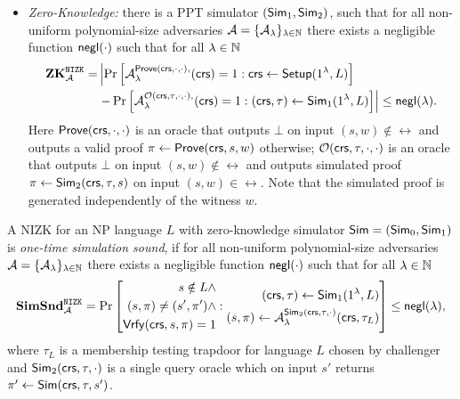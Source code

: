\begin{definition}
\begin{itemize}
\item \emph{Zero-Knowledge:} there is a PPT simulator $(\mathsf{Sim}_1, \mathsf{Sim}_2)$, such that for all non-uniform polynomial-size adversaries $\mathcal{A} = \{\mathcal{A}_{\lambda}\}_{\lambda \in \mathbb{N}}$ there exists a negligible function $\mathsf{negl}(\cdot)$ such that for all $\lambda \in \mathbb{N}$ 
\begin{align*}
\mathbf{ZK}_{\mathcal{A}}^{\mathtt{NIZK}} =& 
\left| \Pr\left[ \mathcal{A}_{\lambda}^{\mathsf{Prove}(\mathsf{crs}, \cdot, \cdot),}(\mathsf{crs}) = 1:\mathsf{crs} \leftarrow \mathsf{Setup}(1{^{\lambda}}, L) \right] \right. \\
&\left. - \Pr\left[ \mathcal{A}_{\lambda}^{\mathcal{O}(\mathsf{crs}, \tau, \cdot, \cdot),}(\mathsf{crs}) = 1: (\mathsf{crs}, \tau) \leftarrow \mathsf{Sim}_1(1{^{\lambda}}, L) \right] \right|
\leq \mathsf{negl}(\lambda).
\end{align*}
Here $\mathsf{Prove}(\mathsf{crs}, \cdot, \cdot)$ is an oracle that outputs $\bot$ on input $(s,w) \notin \rel$ and outputs a valid proof $\pi \leftarrow \mathsf{Prove}(\mathsf{crs}, s, w)$ otherwise; $\mathcal{O}(\mathsf{crs}, \tau, \cdot, \cdot)$ is an oracle that outputs $\bot$ on input $(s,w) \notin \rel$ and outputs simulated proof $\pi \leftarrow \mathsf{Sim}_2(\mathsf{crs}, \tau, s)$ on input $(s,w) \in \rel$. Note that the simulated proof is generated independently of the witness $w$.
\end{itemize}

\end{definition}

\begin{definition}
A NIZK for an NP language $L$ with zero-knowledge simulator $\mathsf{Sim} = (\mathsf{Sim}_0, \mathsf{Sim}_1)$ is \emph{one-time simulation sound}, if for all non-uniform polynomial-size adversaries $\mathcal{A} = \{\mathcal{A}_{\lambda}\}_{\lambda \in \mathbb{N}}$ there exists a negligible function $\mathsf{negl}(\cdot)$ such that for all $\lambda \in \mathbb{N}$ 
\[
\mathbf{SimSnd}_{\mathcal{A}}^{\mathtt{NIZK}} = \Pr\left[
\begin{aligned}
s \notin L \land \\
(s, \pi) \neq (s', \pi') \land \\
\mathsf{Vrfy}(\mathsf{crs}, s, \pi) = 1
\end{aligned}
:
\begin{aligned}
(\mathsf{crs}, \tau) \leftarrow \mathsf{Sim}_1(1{^{\lambda}}, L) \\
(s, \pi) \leftarrow \mathcal{A}_{\lambda}^{\mathsf{Sim}_2(\mathsf{crs}, \tau, \cdot)}(\mathsf{crs}, \tau_L)
\end{aligned} \right] \leq \mathsf{negl}(\lambda),
\]
where $\tau_L$ is a membership testing trapdoor for language $L$ chosen by challenger and $\mathsf{Sim}_2(\mathsf{crs}, \tau, \cdot)$ is a single query oracle which on input $s'$ returns $\pi' \leftarrow \mathsf{Sim}(\mathsf{crs}, \tau, s')$.
\end{definition}













